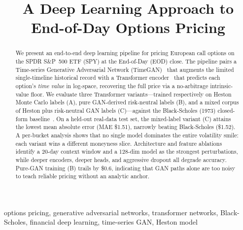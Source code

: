 \documentclass[conference]{IEEEtran}
\begin{document}
\title{A Deep Learning Approach to End-of-Day Options Pricing}

\author{
}

\maketitle

\begin{abstract}
We present an end-to-end deep learning pipeline for pricing
European call options on the SPDR S\&P~500 ETF (SPY) at the
End-of-Day (EOD) close. The pipeline pairs a Time-series
Generative Adversarial Network (TimeGAN)~\cite{yoon2019timegan}
that augments the limited single-timeline historical record
with a Transformer encoder~\cite{vaswani2017attention} that
predicts each option's \emph{time value} in log-space, recovering
the full price via a no-arbitrage intrinsic-value floor. We
evaluate three Transformer variants---trained respectively on
Heston Monte Carlo labels (A), pure GAN-derived risk-neutral
labels (B), and a mixed corpus of Heston plus risk-neutral GAN
labels (C)---against the Black-Scholes (1973) closed-form
baseline~\cite{black1973pricing}. On a held-out real-data test
set, the mixed-label variant (C) attains the lowest mean
absolute error (MAE \$1.51), narrowly beating Black-Scholes
(\$1.52). A per-bucket analysis shows that no single model
dominates the entire volatility smile: each variant wins a
different moneyness slice. Architecture and feature ablations
identify a 20-day context window and a 128-dim model as the
strongest perturbations, while deeper encoders, deeper heads,
and aggressive dropout all degrade accuracy. Pure-GAN training
(B) trails by \$0.6, indicating that GAN paths alone are too
noisy to teach reliable pricing without an analytic anchor.
\end{abstract}

\begin{IEEEkeywords}
options pricing, generative adversarial networks, transformer
networks, Black-Scholes, financial deep learning, time-series
GAN, Heston model
\end{IEEEkeywords}
\end{document}
